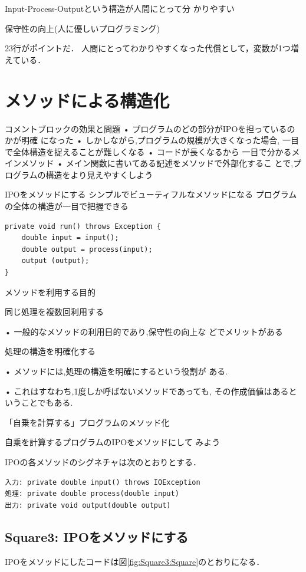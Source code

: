 \documentclass[a4j, twoside]{jsbook}
\begin{document}
 Input-Process-Outputという構造が人間にとって分
かりやすい

 保守性の向上(人に優しいプログラミング)

23行がポイントだ．
人間にとってわかりやすくなった代償として，変数が1つ増えている．

\section{メソッドによる構造化}
コメントブロックの効果と問題
• プログラムのどの部分がIPOを担っているのかが明確
になった
• しかしながら,プログラムの規模が大きくなった場合,
一目で全体構造を捉えることが難しくなる
• コードが長くなるから
一目で分かるメインメソッド
• メイン関数に書いてある記述をメソッドで外部化するこ
とで,プログラムの構造をより見えやすくしよう

IPOをメソッドにする
シンプルでビューティフルなメソッドになる
 プログラムの全体の構造が一目で把握できる

\begin{verbatim}
private void run() throws Exception {
    double input = input();
    double output = process(input);
    output (output);
}
\end{verbatim}

メソッドを利用する目的

同じ処理を複数回利用する

• 一般的なメソッドの利用目的であり,保守性の向上な
どでメリットがある

処理の構造を明確化する

• メソッドには,処理の構造を明確にするという役割が
ある.

• これはすなわち,1度しか呼ばないメソッドであっても,
その作成価値はあるということでもある.

\begin{例題}
 「自乗を計算する」プログラムのメソッド化

 自乗を計算するプログラムのIPOをメソッドにして
みよう
\end{例題}

IPOの各メソッドのシグネチャは次のとおりとする．

\begin{verbatim}
入力: private double input() throws IOException
処理: private double process(double input)
出力: private void output(double output)
\end{verbatim}

\subsection{Square3: IPOをメソッドにする}
IPOをメソッドにしたコードは図\ref{fig:Square3:Square}のとおりになる．
\end{document}
